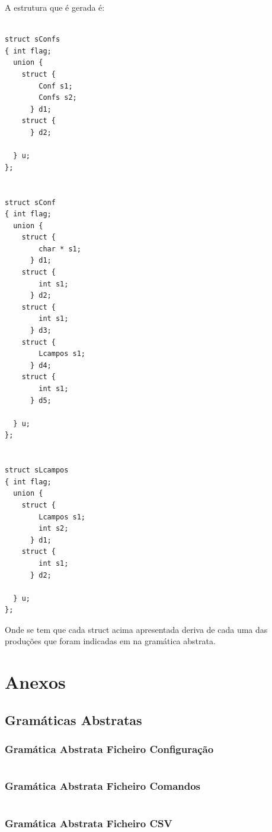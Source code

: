 \documentclass[11pt, a4paper, oneside]{article}
\begin{document}
A estrutura que é gerada é:
\begin{verbatim}

struct sConfs 
{ int flag;
  union {  
    struct {
        Conf s1;
        Confs s2;
      } d1;
    struct {
      } d2;

  } u;
};


struct sConf 
{ int flag;
  union {  
    struct {
        char * s1;
      } d1;
    struct {
        int s1;
      } d2;
    struct {
        int s1;
      } d3;
    struct {
        Lcampos s1;
      } d4;
    struct {
        int s1;
      } d5;

  } u;
};


struct sLcampos 
{ int flag;
  union {  
    struct {
        Lcampos s1;
        int s2;
      } d1;
    struct {
        int s1;
      } d2;

  } u;
};
\end{verbatim}

Onde se tem que cada struct acima apresentada deriva de cada uma das produções que foram indicadas em na gramática abstrata.

\newpage

\section{Anexos}
\label{sec:Anexos}
\subsection{Gramáticas Abstratas}
\subsubsection{Gramática Abstrata Ficheiro Configuração}
\begin{verbatim}

\end{verbatim}

\subsubsection{Gramática Abstrata Ficheiro Comandos}
\begin{verbatim}

\end{verbatim}

\subsubsection{Gramática Abstrata Ficheiro CSV}
\begin{verbatim}

\end{verbatim}
\end{document}
